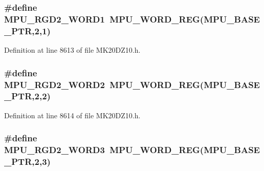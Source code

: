\subsubsection[{\texorpdfstring{M\+P\+U\+\_\+\+R\+G\+D2\+\_\+\+W\+O\+R\+D1}{MPU_RGD2_WORD1}}]{\setlength{\rightskip}{0pt plus 5cm}\#define M\+P\+U\+\_\+\+R\+G\+D2\+\_\+\+W\+O\+R\+D1~{\bf M\+P\+U\+\_\+\+W\+O\+R\+D\+\_\+\+R\+EG}({\bf M\+P\+U\+\_\+\+B\+A\+S\+E\+\_\+\+P\+TR},2,1)}\hypertarget{group___m_p_u___register___accessor___macros_ga0d02a8934264e559ede948b61da3d3da}{}\label{group___m_p_u___register___accessor___macros_ga0d02a8934264e559ede948b61da3d3da}


Definition at line 8613 of file M\+K20\+D\+Z10.\+h.

\subsubsection[{\texorpdfstring{M\+P\+U\+\_\+\+R\+G\+D2\+\_\+\+W\+O\+R\+D2}{MPU_RGD2_WORD2}}]{\setlength{\rightskip}{0pt plus 5cm}\#define M\+P\+U\+\_\+\+R\+G\+D2\+\_\+\+W\+O\+R\+D2~{\bf M\+P\+U\+\_\+\+W\+O\+R\+D\+\_\+\+R\+EG}({\bf M\+P\+U\+\_\+\+B\+A\+S\+E\+\_\+\+P\+TR},2,2)}\hypertarget{group___m_p_u___register___accessor___macros_ga1acf5c43b8a76d3e41a2b2b31722fd7c}{}\label{group___m_p_u___register___accessor___macros_ga1acf5c43b8a76d3e41a2b2b31722fd7c}


Definition at line 8614 of file M\+K20\+D\+Z10.\+h.

\subsubsection[{\texorpdfstring{M\+P\+U\+\_\+\+R\+G\+D2\+\_\+\+W\+O\+R\+D3}{MPU_RGD2_WORD3}}]{\setlength{\rightskip}{0pt plus 5cm}\#define M\+P\+U\+\_\+\+R\+G\+D2\+\_\+\+W\+O\+R\+D3~{\bf M\+P\+U\+\_\+\+W\+O\+R\+D\+\_\+\+R\+EG}({\bf M\+P\+U\+\_\+\+B\+A\+S\+E\+\_\+\+P\+TR},2,3)}\hypertarget{group___m_p_u___register___accessor___macros_gab85c0accc674d2ea25f3cc7440f1a10b}{}\label{group___m_p_u___register___accessor___macros_gab85c0accc674d2ea25f3cc7440f1a10b}



